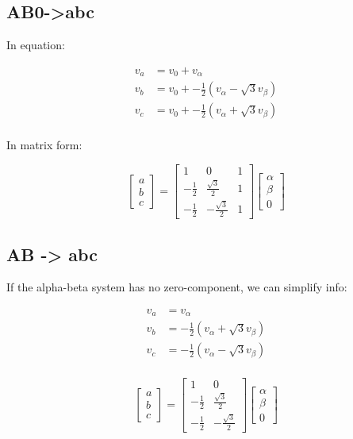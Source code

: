 \documentclass[]{book}
\begin{document}
\hypertarget{ab0-abc}{%
\subsection{AB0-\textgreater{}abc}\label{ab0-abc}}

In equation:

\[
\begin{aligned}
v_a &= v_0+v_\alpha  \\
v_b &=  v_0+- \frac{1}{2}(v_\alpha -\sqrt{3}v_\beta)\\
v_c &=  v_0+- \frac{1}{2}(v_\alpha +\sqrt{3}v_\beta)\\
\end{aligned}
\label{eq:transAB0abc1}
\]

In matrix form:

\[
\begin{bmatrix} a\\ b \\ c \end{bmatrix}
= \begin{bmatrix} 1 & 0 & 1 \\ -\frac{1}{2} & \frac{\sqrt{3}}{2} & 1 \\ -\frac{1}{2} & -\frac{\sqrt{3}}{2} & 1 \end{bmatrix}
\begin{bmatrix} \alpha\\ \beta \\ 0\end{bmatrix}
\label{eq:transAB0abc2}
\]

\hypertarget{ab---abc}{%
\subsection{AB -\textgreater{} abc}\label{ab---abc}}

If the alpha-beta system has no zero-component, we can simplify info:

\[
\begin{aligned}
v_a &=  v_\alpha \\
v_b &= - \frac{1}{2}(v_\alpha +\sqrt{3}v_\beta) \\
v_c &= - \frac{1}{2}(v_\alpha -\sqrt{3}v_\beta) \\
\end{aligned}
\label{eq:transABabc1}
\]

\[
\begin{bmatrix} a\\ b \\ c \end{bmatrix}
= \begin{bmatrix} 1 & 0  \\ -\frac{1}{2} & \frac{\sqrt{3}}{2}  \\ -\frac{1}{2} & -\frac{\sqrt{3}}{2}  \end{bmatrix}
\begin{bmatrix} \alpha\\ \beta \\ 0 \end{bmatrix}
\label{eq:transABabc1}
\]
\end{document}
